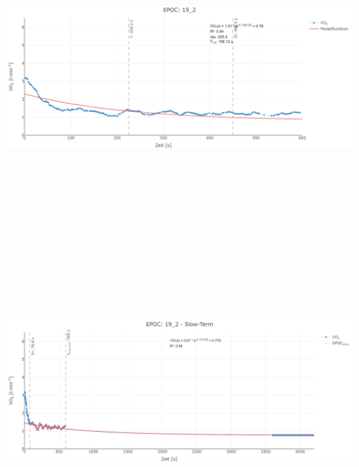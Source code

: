 \documentclass[
  letterpaper,
  DIV=11]{scrartcl}
\begin{document}
\includegraphics[width=11.45833in,height=4.6875in]{images/19_2_tau.png}
\includegraphics[width=11.45833in,height=4.6875in]{images/19_2_slow.png}
\end{document}
